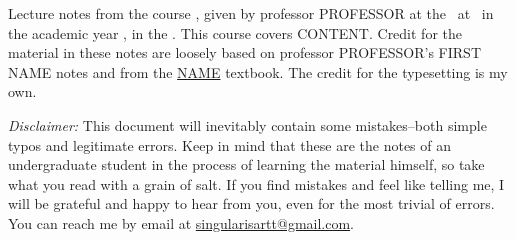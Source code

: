 Lecture notes from the course \MyTitle, given by professor PROFESSOR at the \faculty~at \location~in the academic year \academicyear, in the \term. This course covers CONTENT. Credit for the material in these notes are loosely based on professor PROFESSOR's FIRST NAME notes and from the \href{LINK}{NAME} textbook. The credit for the typesetting is my own.

\textit{Disclaimer:} This document will inevitably contain some mistakes--both simple typos and legitimate errors. Keep in mind that these are the notes of an undergraduate student in the process of learning the material himself, so take what you read with a grain of salt. If you find mistakes and feel like telling me, I will be grateful and happy to hear from you, even for the most trivial of errors. You can reach me by email at \href{mailto:singularisartt@gmail.com}{singularisartt@gmail.com}.
